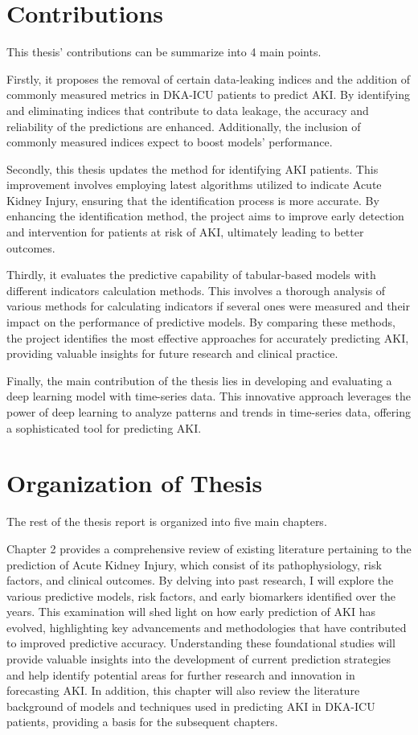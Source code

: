 \documentclass[../main.tex]{subfiles}
\begin{document}
\section{Contributions}

This thesis' contributions can be summarize into 4 main points.

Firstly, it proposes the removal of certain data-leaking indices and the addition of commonly measured metrics in \gls{DKA-ICU} patients to predict AKI. 
By identifying and eliminating indices that contribute to data leakage, the accuracy and reliability of the predictions are enhanced. 
Additionally, the inclusion of commonly measured indices expect to boost models' performance.

Secondly, this thesis updates the method for identifying \gls{AKI} patients. This improvement involves employing latest algorithms utilized to indicate Acute Kidney Injury, ensuring that the identification process is more accurate.
By enhancing the identification method, the project aims to improve early detection and intervention for patients at risk of AKI, ultimately leading to better outcomes.

Thirdly, it evaluates the predictive capability of tabular-based models with different indicators calculation methods. 
This involves a thorough analysis of various methods for calculating indicators if several ones were measured and their impact on the performance of predictive models. 
By comparing these methods, the project identifies the most effective approaches for accurately predicting AKI, providing valuable insights for future research and clinical practice.

Finally, the main contribution of the thesis lies in developing and evaluating a deep learning model with time-series data.
This innovative approach leverages the power of deep learning to analyze patterns and trends in time-series data, offering a sophisticated tool for predicting AKI.

\section{Organization of Thesis}
The rest of the thesis report is organized into five main chapters.

Chapter 2 provides a comprehensive review of existing literature pertaining to the prediction of Acute Kidney Injury,  which consist of its pathophysiology, risk factors, and clinical outcomes.
By delving into past research, I will explore the various predictive models, risk factors, and early biomarkers identified over the years.
This examination will shed light on how early prediction of \gls{AKI} has evolved, highlighting key advancements and methodologies that have contributed to improved predictive accuracy.
Understanding these foundational studies will provide valuable insights into the development of current prediction strategies and help identify potential areas for further research and innovation in forecasting AKI.
In addition, this chapter will also review the literature background of models and techniques used in predicting \gls{AKI} in \gls{DKA-ICU} patients, providing a basis for the subsequent chapters.
\end{document}
